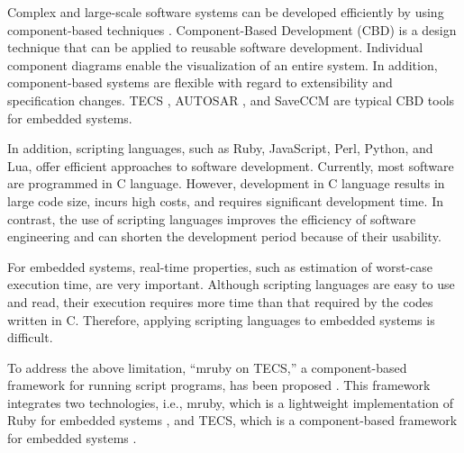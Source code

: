 \documentclass[conference]{IEEEtran/IEEEtran/IEEEtran}
\begin{document}
Complex and large-scale software systems can be developed efficiently by using component-based techniques \cite{par:Crnkovic}.
Component-Based Development (CBD) is a design technique that can be applied to reusable software development.
Individual component diagrams enable the visualization of an entire system.
In addition, component-based systems are flexible with regard to extensibility and specification changes.
TECS \cite{par:TECS}, AUTOSAR \cite{url:AUTOSAR}, and SaveCCM \cite{par:SAVEapproach} are typical CBD tools for embedded systems.

In addition, scripting languages, such as Ruby, JavaScript, Perl, Python, and Lua, offer efficient approaches to software development.
Currently, most software are programmed in C language.
However, development in C language results in large code size, incurs high costs, and requires significant development time.
In contrast, the use of scripting languages improves the efficiency of software engineering and can shorten the development period because of their usability. 

For embedded systems, real-time properties, such as estimation of worst-case execution time, are very important.
Although scripting languages are easy to use and read, their execution requires more time than that required by the codes written in C.
Therefore, applying scripting languages to embedded systems is difficult.

To address the above limitation, ``mruby on TECS,'' a component-based framework for running script programs, has been proposed \cite{par:mrubyonTECS}.
This framework integrates two technologies, i.e., mruby, which is a lightweight implementation of Ruby for embedded systems \cite{par:mruby}, and TECS, which is a component-based framework for embedded systems \cite{par:TECS}.
\end{document}

